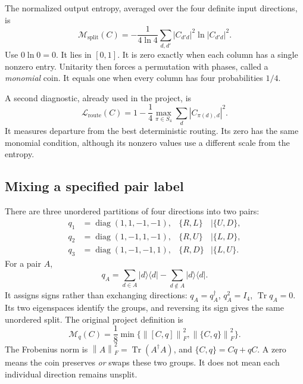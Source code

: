 \documentclass[11pt,a4paper,oneside]{report}
\newcommand{\ket}[1]{\lvert #1\rangle}
\newcommand{\bra}[1]{\langle #1\rvert}
\newcommand{\Id}{I}
\newcommand{\Tr}{\operatorname{Tr}}
\newcommand{\diag}{\operatorname{diag}}
\newcommand{\norm}[1]{\left\lVert#1\right\rVert}
\numberwithin{equation}{chapter}
\begin{document}
The normalized output entropy, averaged over the four definite input
directions, is
\begin{equation}
\boxed{
\mathcal M_{\mathrm{split}}(C)
=-\frac1{4\ln4}\sum_{d,d'}|C_{d'd}|^2\ln|C_{d'd}|^2.
}
\label{eq:split}
\end{equation}
Use \(0\ln0=0\). It lies in \([0,1]\). It is zero exactly when
each column has a single nonzero entry. Unitarity then forces a
permutation with phases, called a \emph{monomial} coin. It equals
one when every column has four probabilities \(1/4\).

A second diagnostic, already used in the project, is
\begin{equation}
\mathcal L_{\mathrm{route}}(C)
=1-\frac14\max_{\pi\in S_4}\sum_d|C_{\pi(d),d}|^2.
\end{equation}
It measures departure from the best deterministic routing. Its zero
has the same monomial condition, although its nonzero values use a
different scale from the entropy.

\subsection{Mixing a specified pair label}

There are three unordered partitions of four directions into two pairs:
\begin{align}
q_1&=\diag(1,1,-1,-1),&\{R,L\}&\mid\{U,D\},\\
q_2&=\diag(1,-1,1,-1),&\{R,U\}&\mid\{L,D\},\\
q_3&=\diag(1,-1,-1,1),&\{R,D\}&\mid\{L,U\}.
\end{align}
For a pair \(A\),
\begin{equation}
q_A=\sum_{d\in A}\ket d\bra d-\sum_{d\notin A}\ket d\bra d.
\end{equation}
It assigns signs rather than exchanging directions:
\(q_A=q_A^\dagger\), \(q_A^2=\Id_4\), \(\Tr q_A=0\).
Its two eigenspaces identify the groups, and reversing its sign gives
the same unordered split. The original project definition is
\begin{equation}
\boxed{
\mathcal M_q(C)=\frac18\min\{
\norm{[C,q]}_F^2,\norm{\{C,q\}}_F^2\}.
}
\end{equation}
The Frobenius norm is \(\norm A_F^2=\Tr(A^\dagger A)\), and
\(\{C,q\}=Cq+qC\). A zero means the coin preserves \emph{or}
swaps these two groups. It does not mean each individual direction
remains unsplit.
\end{document}
